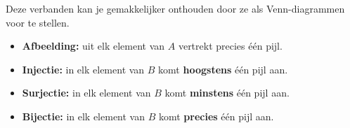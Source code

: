 Deze verbanden kan je gemakkelijker onthouden door ze als Venn-diagrammen voor te stellen.
\begin{itemize}
    \item \textbf{Afbeelding:} uit elk element van $A$ vertrekt precies één pijl.
    \begin{center}
        \resizebox{0.5\textwidth}{!}{
            
        }
    \end{center}

    \item \textbf{Injectie:} in elk element van $B$ komt \textbf{hoogstens} één pijl aan.
    \begin{center}
        \resizebox{0.5\textwidth}{!}{
            
        }
    \end{center}

    \item \textbf{Surjectie:} in elk element van $B$ komt \textbf{minstens} één pijl aan.
    \begin{center}
        \resizebox{0.5\textwidth}{!}{
            
        }
    \end{center}
    
    \item \textbf{Bijectie:} in elk element van $B$ komt \textbf{precies} één pijl aan.
    \begin{center}
        \resizebox{0.5\textwidth}{!}{
            
        }
    \end{center}
\end{itemize}

